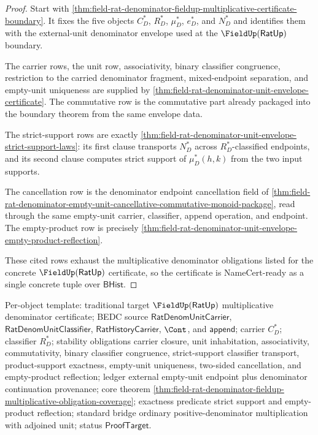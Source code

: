 \begin{proof}
Start with
\autoref{thm:field-rat-denominator-fieldup-multiplicative-certificate-boundary}.
It fixes the five objects $C_D^\ast$, $R_D^\ast$, $\mu_D^\ast$, $e_D^\ast$,
and $N_D^\ast$ and identifies them with the external-unit denominator envelope
used at the $\FieldUp(\mathsf{RatUp})$ boundary.

The carrier rows, the unit row, associativity, binary classifier congruence,
restriction to the carried denominator fragment, mixed-endpoint separation,
and empty-unit uniqueness are supplied by
\autoref{thm:field-rat-denominator-unit-envelope-certificate}. The
commutative row is the commutative part already packaged into the boundary
theorem from the same envelope data.

The strict-support rows are exactly
\autoref{thm:field-rat-denominator-unit-envelope-strict-support-laws}: its
first clause transports $N_D^\ast$ across $R_D^\ast$-classified endpoints, and
its second clause computes strict support of $\mu_D^\ast(h,k)$ from the two
input supports.

The cancellation row is the denominator endpoint cancellation field of
\autoref{thm:field-rat-denominator-empty-unit-cancellative-commutative-monoid-package},
read through the same empty-unit carrier, classifier, append operation, and
endpoint. The empty-product row is precisely
\autoref{thm:field-rat-denominator-unit-envelope-empty-product-reflection}.

These cited rows exhaust the multiplicative denominator obligations listed for
the concrete $\FieldUp(\mathsf{RatUp})$ certificate, so the certificate is
NameCert-ready as a single concrete tuple over $\mathsf{BHist}$.
\end{proof}

Per-object template: traditional target
$\FieldUp(\mathsf{RatUp})$ multiplicative denominator certificate; BEDC source
$\mathsf{RatDenomUnitCarrier}$, $\mathsf{RatDenomUnitClassifier}$,
$\mathsf{RatHistoryCarrier}$, $\Cont$, and $\mathsf{append}$; carrier
$C_D^\ast$; classifier $R_D^\ast$; stability obligations carrier closure, unit
inhabitation, associativity, commutativity, binary classifier congruence,
strict-support classifier transport, product-support exactness, empty-unit
uniqueness, two-sided cancellation, and empty-product reflection; ledger
external empty-unit endpoint plus denominator continuation provenance; core
theorem
\autoref{thm:field-rat-denominator-fieldup-multiplicative-obligation-coverage};
exactness predicate strict support and empty-product reflection; standard
bridge ordinary positive-denominator multiplication with adjoined unit; status
$\mathsf{ProofTarget}$.
